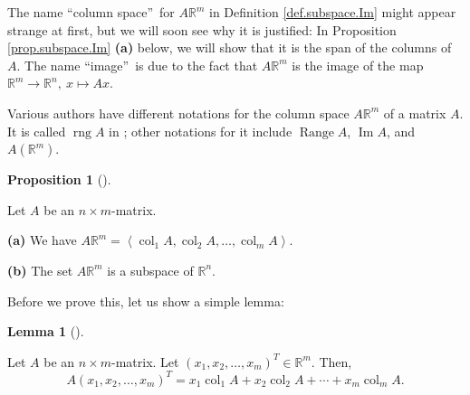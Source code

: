\documentclass[numbers=enddot,12pt,final,onecolumn,notitlepage]{scrartcl}%
\theoremstyle{definition}
\newtheorem{lem}[theo]{Lemma}
\newenvironment{lemma}[1][]
{\begin{lem}[#1]\begin{leftbar}}
{\end{leftbar}\end{lem}}
\newtheorem{prop}[theo]{Proposition}
\newenvironment{proposition}[1][]
{\begin{prop}[#1]\begin{leftbar}}
{\end{leftbar}\end{prop}}
\begin{document}
The name \textquotedblleft column space\textquotedblright\ for $A\mathbb{R}%
^{m}$ in Definition \ref{def.subspace.Im} might appear strange at first, but
we will soon see why it is justified: In Proposition \ref{prop.subspace.Im}
\textbf{(a)} below, we will show that it is the span of the columns of $A$.
The name \textquotedblleft image\textquotedblright\ is due to the fact that
$A\mathbb{R}^{m}$ is the image of the map $\mathbb{R}^{m}\rightarrow
\mathbb{R}^{n},\ x\mapsto Ax$.

Various authors have different notations for the column space $A\mathbb{R}%
^{m}$ of a matrix $A$. It is called $\operatorname*{rng}A$ in \cite{OlvSha06};
other notations for it include $\operatorname*{Range}A$, $\operatorname*{Im}%
A$, and $A\left(  \mathbb{R}^{m}\right)  $.

\begin{proposition}
\label{prop.subspace.Im}Let $A$ be an $n\times m$-matrix.

\textbf{(a)} We have $A\mathbb{R}^{m}=\left\langle \operatorname*{col}%
\nolimits_{1}A,\operatorname*{col}\nolimits_{2}A,\ldots,\operatorname*{col}%
\nolimits_{m}A\right\rangle $.

\textbf{(b)} The set $A\mathbb{R}^{m}$ is a subspace of $\mathbb{R}^{n}$.
\end{proposition}

Before we prove this, let us show a simple lemma:

\begin{lemma}
\label{lem.subspace.Im.Ax}Let $A$ be an $n\times m$-matrix. Let $\left(
x_{1},x_{2},\ldots,x_{m}\right)  ^{T}\in\mathbb{R}^{m}$. Then,%
\[
A\left(  x_{1},x_{2},\ldots,x_{m}\right)  ^{T}=x_{1}\operatorname*{col}%
\nolimits_{1}A+x_{2}\operatorname*{col}\nolimits_{2}A+\cdots+x_{m}%
\operatorname*{col}\nolimits_{m}A.
\]

\end{lemma}
\end{document}
